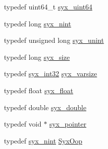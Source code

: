 \begin{CompactItemize}
\item 
typedef uint64\_\-t \hyperlink{syx-types_8h_5a7750bec2122e7d3fccdffa19e87efe}{syx\_\-uint64}
\item 
typedef long \hyperlink{syx-types_8h_488ad2504ade19c761a3e2a1726b4781}{syx\_\-nint}
\item 
typedef unsigned long \hyperlink{syx-types_8h_8126e64ffb4098d51f48eb5c7c1167ed}{syx\_\-unint}
\item 
typedef long \hyperlink{syx-types_8h_c33c3b1cda2a02ee8987fd22f1ce89be}{syx\_\-size}
\item 
typedef \hyperlink{syx-types_8h_9f31c17555a2dfcf25da84b5c4a2e55b}{syx\_\-int32} \hyperlink{syx-types_8h_18e1a1417591a1efb670b97ce320f535}{syx\_\-varsize}
\item 
typedef float \hyperlink{syx-types_8h_06247c78a325efbaa525b201c733efdb}{syx\_\-float}
\item 
typedef double \hyperlink{syx-types_8h_cc7fcb78741daa005b6897ad40b7472b}{syx\_\-double}
\item 
typedef void $\ast$ \hyperlink{syx-types_8h_51c518ab1f082eb4330ca143afb1584f}{syx\_\-pointer}
\item 
typedef \hyperlink{syx-types_8h_488ad2504ade19c761a3e2a1726b4781}{syx\_\-nint} \hyperlink{syx-types_8h_1121caba2d40b2ce090b640762744ccd}{SyxOop}
\end{CompactItemize}
